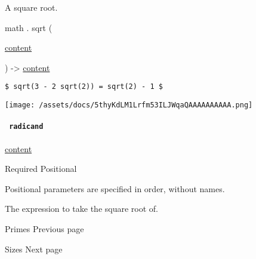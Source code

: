 A square root.

math { . } { sqrt } (

{ \href{/docs/reference/foundations/content/}{content} }

) -\textgreater{} \href{/docs/reference/foundations/content/}{content}

\begin{verbatim}
$ sqrt(3 - 2 sqrt(2)) = sqrt(2) - 1 $
\end{verbatim}

\texttt{[image: /assets/docs/5thyKdLM1Lrfm53ILJWqaQAAAAAAAAAA.png]}

\paragraph{\texorpdfstring{\texttt{\ radicand\ }}{ radicand }}\label{functions-sqrt-radicand}

\href{/docs/reference/foundations/content/}{content}

{Required} {{ Positional }}

\label{functions-sqrt-radicand-positional-tooltip}
Positional parameters are specified in order, without names.

The expression to take the square root of.

\href{/docs/reference/math/primes/}{\pandocbounded{}}

{ Primes } { Previous page }

\href{/docs/reference/math/sizes/}{\pandocbounded{}}

{ Sizes } { Next page }
